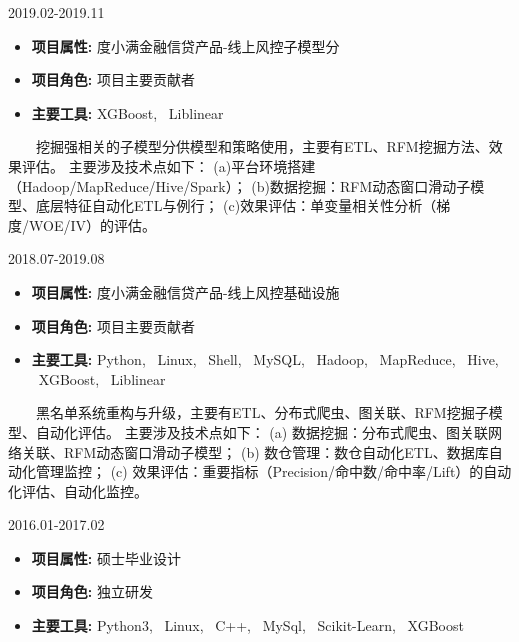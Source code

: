 \documentclass{resume}
\begin{document}
                      {2019.02-2019.11}

\begin{itemize}  [parsep=0.5ex]

  \item   \textbf{  项目属性:  }   {  度小满金融信贷产品-线上风控子模型分  }                
  \item   \textbf{  项目角色:  }   {  项目主要贡献者  }
  \item   \textbf{  主要工具:  }   {  XGBoost, \ Liblinear  }

\end{itemize}


{    \ \ \ \ 挖掘强相关的子模型分供模型和策略使用，主要有ETL、RFM挖掘方法、效果评估。
主要涉及技术点如下：
(a)平台环境搭建（Hadoop/MapReduce/Hive/Spark）；
(b)数据挖掘：RFM动态窗口滑动子模型、底层特征自动化ETL与例行；
(c)效果评估：单变量相关性分析（梯度/WOE/IV）的评估。}

\medskip





                             {2018.07-2019.08}

\begin{itemize} [parsep=0.5ex]

\item   \textbf{  项目属性:  }  {  度小满金融信贷产品-线上风控基础设施  }
\item   \textbf{  项目角色:  }  {  项目主要贡献者  }
\item   \textbf{  主要工具:  }  {  Python, \ Linux, \ Shell, \ MySQL, \ Hadoop, \ MapReduce, \ Hive, \ XGBoost, \ Liblinear  }

\end{itemize}


{  \ \ \ \ 黑名单系统重构与升级，主要有ETL、分布式爬虫、图关联、RFM挖掘子模型、自动化评估。
主要涉及技术点如下：
(a) 数据挖掘：分布式爬虫、图关联网络关联、RFM动态窗口滑动子模型；
(b) 数仓管理：数仓自动化ETL、数据库自动化管理监控；
(c) 效果评估：重要指标（Precision/命中数/命中率/Lift）的自动化评估、自动化监控。}

\medskip





                   {2016.01-2017.02}

\begin{itemize} [parsep=0.5ex]

\item   \textbf{ 项目属性: }   {硕士毕业设计}
\item   \textbf{ 项目角色: }   {独立研发}    
\item   \textbf{ 主要工具: }  { Python3,  \ Linux,  \ C++,  \ MySql,  \ Scikit-Learn,  \ XGBoost }

\end{itemize}
\end{document}
